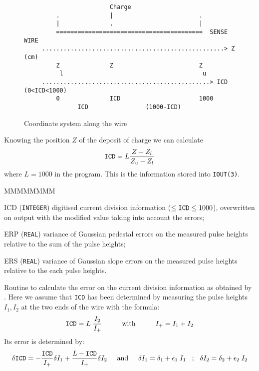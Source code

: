 \begin{figure}[hbt]
     \centering
\begin{verbatim}
                        Charge                     
         .              |                        .
         |              .                        |
         =========================================  SENSE WIRE
     ...................................................> Z (cm)
         Z              Z                        Z 
          l                                       u
     ...............................................> ICD (0<ICD<1000)
         0              ICD                      1000
               ICD                (1000-ICD)
\end{verbatim}
     \caption{Coordinate system along the wire}
     \label{fg:hits510-1}
\end{figure}

Knowing the position $Z$ of the deposit of charge we can calculate
\[
\mbox{\tt ICD} = L \frac{Z-Z_l}{Z_u -Z_l} 
\]
where $L=1000$ in the
program. This is the information stored into {\tt IOUT(3)}.

\begin{DLtt}{MMMMMMMM}
\item[ICD] ({\tt INTEGER}) digitised current division information 
($\leq\mbox{\tt ICD}\leq1000$), overwritten on output with the
modified value taking into account the errors;
\item[ERP] ({\tt REAL}) variance of Gaussian pedestal errors 
on the measured
pulse heights relative to the sum of the pulse heights;
\item[ERS] ({\tt REAL}) variance of Gaussian slope 
errors on the measured
pulse heights relative to the each pulse heights.
\end{DLtt}
Routine to calculate the error on the current division
information as obtained by .
Here we assume that {\tt ICD} has been determined by measuring the pulse heights 
$I_1, I_2$ at the two ends of the wire with the formula:
\[
\mbox{\tt ICD} = L \; \frac{I_2}{I_+} 
\mbox{\hspace{1cm}with\hspace{1cm}}  I_+ = I_1+I_2 
\]
Its error is determined by:
\[
\delta \mbox{\tt ICD} = - \frac{\mbox{\tt ICD}}{I_+} \delta I_1 + 
\frac{L-\mbox{\tt ICD}}{I_+}  \delta I_2
\mbox{\hspace{5mm}and\hspace{5mm}}
\delta I_1 = \delta_1 + \epsilon_1 \; I_1  \mbox{\hspace{3mm};\hspace{3mm}}
\delta I_2 = \delta_2 + \epsilon_2 \; I_2 
\]
 
